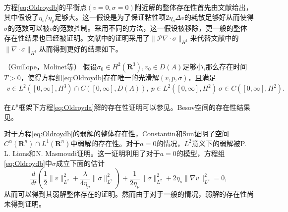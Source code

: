方程\eqref{eq:Oldroydb}的平衡点$(v=0,\sigma=0)$附近解的整体存在性首先由文献\cite{guillope1990existence}给出，其中假设了$\eta_s/\eta_p$足够大。这一假设是为了保证粘性项$ 2 \eta_s \Delta v$的耗散足够好从而使得$\sigma$的范数可以被$v$的范数控制。采用不同的方法，这一假设被移除，更一般的整体存在性结果也已经被证明\cite{chupin2004some,molinet2004global,molinet2004existence}。文献\cite{molinet2004global,molinet2004existence}中的证明采用了$\|\mathcal{P}\nabla \cdot \sigma\|_{H^1}$来代替文献\cite{guillope1990existence}中的$\|\nabla \cdot \sigma\|_{H^1}$从而得到更好的结果如下。
\begin{theorem}（Guillope，Molinet等\cite{guillope1990existence,molinet2004existence}）
	假设$\sigma_0 \in H^2(\mathbf{R}^3),v_0 \in D(A)$足够小,那么存在时间$T>0$，使得方程组\eqref{eq:Oldroydb}存在唯一的光滑解$(v,p,\sigma)$，且满足
	\begin{eqnarray*}
		v \in L^2([0,\infty],H^3) \cap C([0,\infty],D(A)), \ p \in L^2([0,\infty],H^2) \ \sigma \in C([0,\infty],H^2).
	\end{eqnarray*}
\end{theorem}

在$L^p$框架下方程\eqref{eq:Oldroyda}解的存在性证明可以参见\cite{fernandez1998some,zhang2012global}。Besov空间的存在性结果见\cite{chemin2001lifespan}。

对于方程\eqref{eq:Oldroydb}的弱解的整体存在性，Constantin和Sun证明了空间$C^\alpha(\mathbf{R}^n) \cap L^1(\mathbf{R}^n)$中弱解的存在性\cite{constantin2010remarks,saut2012lectures}。对于$a=0$的情况，$L^2$意义下的弱解被P. L. Lions和N. Masmoudi证明\cite{lions2000global}。这一证明利用了对于$a=0$的模型，方程组\eqref{eq:Oldroydb}中$\sigma$成立下面的估计
\begin{equation*}
	\frac{d}{dt} \left(\frac{1}{2} \|v\|_{L^2}^2 +  \frac{\lambda}{4 \eta_p} \|\sigma\|_{L^2}^2 \right) + \frac{1}{2\eta_p} \|\sigma\|_{L^2}^2 + {2 \eta_s} \|\nabla v\|_{L^2}^2 = 0,
\end{equation*}
从而可以得到其弱解整体存在的证明。然而由于对于一般的情况，弱解的存在性尚未得到证明\cite{saut2012lectures}。

